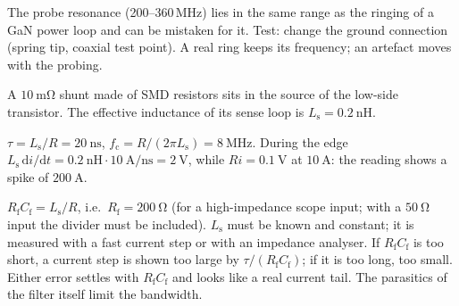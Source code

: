 
\begin{solutionblock}
	The probe resonance (200--360\,MHz) lies in the same range as the ringing of a GaN power loop and can be mistaken for it. Test: change the ground connection (spring tip, coaxial test point). A real ring keeps its frequency; an artefact moves with the probing.
\end{solutionblock}



A $\SI{10}{\milli\ohm}$ shunt made of SMD resistors sits in the source of the low-side transistor. The effective inductance of its sense loop is $L_\mathrm{s}=\SI{0.2}{\nano\henry}$.


\begin{solutionblock}
	$\tau=L_\mathrm{s}/R=\SI{20}{\nano\second}$, $f_\mathrm{c}=R/(2\pi L_\mathrm{s})=\SI{8}{\mega\hertz}$. During the edge $L_\mathrm{s}\,\mathrm{d}i/\mathrm{d}t=\SI{0.2}{\nano\henry}\cdot\SI{10}{\ampere\per\nano\second}=\SI{2}{\volt}$, while $Ri=\SI{0.1}{\volt}$ at $\SI{10}{\ampere}$: the reading shows a spike of $\SI{200}{\ampere}$.
\end{solutionblock}


\begin{solutionblock}
	$R_\mathrm{f}C_\mathrm{f}=L_\mathrm{s}/R$, i.e.\ $R_\mathrm{f}=\SI{200}{\ohm}$ (for a high-impedance scope input; with a $\SI{50}{\ohm}$ input the divider must be included). $L_\mathrm{s}$ must be known and constant; it is measured with a fast current step or with an impedance analyser. If $R_\mathrm{f}C_\mathrm{f}$ is too short, a current step is shown too large by $\tau/(R_\mathrm{f}C_\mathrm{f})$; if it is too long, too small. Either error settles with $R_\mathrm{f}C_\mathrm{f}$ and looks like a real current tail. The parasitics of the filter itself limit the bandwidth.
\end{solutionblock}


